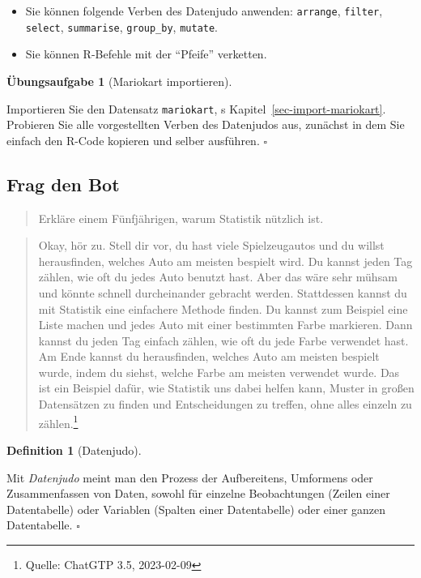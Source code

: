 \documentclass[
  letterpaper,
  oneside,
  open=any]{scrbook}
\providecommand{\tightlist}{%
  \setlength{\itemsep}{0pt}\setlength{\parskip}{0pt}}\usepackage{longtable,booktabs,array}
\theoremstyle{definition}
\newtheorem{exercise}{Übungsaufgabe}[chapter]
\theoremstyle{definition}
\theoremstyle{definition}
\newtheorem{definition}{Definition}[chapter]
\theoremstyle{remark}
\begin{document}
\begin{itemize}
\tightlist
\item
  Sie können folgende Verben des Datenjudo anwenden: \texttt{arrange},
  \texttt{filter}, \texttt{select}, \texttt{summarise},
  \texttt{group\_by}, \texttt{mutate}.
\item
  Sie können R-Befehle mit der \enquote{Pfeife} verketten.
\end{itemize}

\begin{exercise}[Mariokart
importieren]\protect\hypertarget{exr-los}{}\label{exr-los}

Importieren Sie den Datensatz \texttt{mariokart}, s
Kapitel~\ref{sec-import-mariokart}. Probieren Sie alle vorgestellten
Verben des Datenjudos aus, zunächst in dem Sie einfach den R-Code
kopieren und selber ausführen. \(\square\)

\end{exercise}

\subsection{Frag den Bot}\label{frag-den-bot}

\begin{quote}
{} Erkläre einem Fünfjährigen, warum Statistik nützlich
ist.
\end{quote}

\begin{quote}
{} Okay, hör zu. Stell dir vor, du hast viele
Spielzeugautos und du willst herausfinden, welches Auto am meisten
bespielt wird. Du kannst jeden Tag zählen, wie oft du jedes Auto benutzt
hast. Aber das wäre sehr mühsam und könnte schnell durcheinander
gebracht werden. Stattdessen kannst du mit Statistik eine einfachere
Methode finden. Du kannst zum Beispiel eine Liste machen und jedes Auto
mit einer bestimmten Farbe markieren. Dann kannst du jeden Tag einfach
zählen, wie oft du jede Farbe verwendet hast. Am Ende kannst du
herausfinden, welches Auto am meisten bespielt wurde, indem du siehst,
welche Farbe am meisten verwendet wurde. Das ist ein Beispiel dafür, wie
Statistik uns dabei helfen kann, Muster in großen Datensätzen zu finden
und Entscheidungen zu treffen, ohne alles einzeln zu zählen.\footnote{Quelle:
  ChatGTP 3.5, 2023-02-09}
\end{quote}

\begin{definition}[Datenjudo]\protect\hypertarget{def-datenjudo}{}\label{def-datenjudo}

Mit \emph{Datenjudo} meint man den Prozess der Aufbereitens, Umformens
oder Zusammenfassen von Daten, sowohl für einzelne Beobachtungen (Zeilen
einer Datentabelle) oder Variablen (Spalten einer Datentabelle) oder
einer ganzen Datentabelle. \(\square\)

\end{definition}
\end{document}
